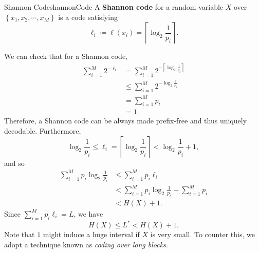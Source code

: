 \documentclass[math]{amznotes}
\theoremstyle{remark}
\begin{document}
\begin{dfnbox}{Shannon Code}{shannonCode}
    A {\color{red} \textbf{Shannon code}} for a random variable $X$ over $\left\{x_1, x_2, \cdots, x_M\right\}$ is a code satisfying 
    \begin{equation*}
        \ell_i \coloneqq \ell\left(x_i\right) = \left\lceil\log_2\frac{1}{p_i}\right\rceil.
    \end{equation*}
\end{dfnbox}
We can check that for a Shannon code,
\begin{align*}
    \sum_{i = 1}^{M}2^{-\ell_i} & = \sum_{i = 1}^{M}2^{-\left\lceil\log_2\frac{1}{p_i}\right\rceil} \\
    & \leq \sum_{i = 1}^{M}2^{-\log_2\frac{1}{p_i}} \\
    & = \sum_{i = 1}^{M}p_i\\
    & = 1.
\end{align*}
Therefore, a Shannon code can be always made prefix-free and thus uniquely decodable. Furthermore, 
\begin{equation*}
    \log_2\frac{1}{p_i} \leq \ell_i = \left\lceil\log_2\frac{1}{p_i}\right\rceil < \log_2\frac{1}{p_i} + 1,
\end{equation*}
and so 
\begin{align*}
    \sum_{i = 1}^{M}p_i\log_2\frac{1}{p_i} & \leq \sum_{i = 1}^{M}p_i\ell_i \\
    & < \sum_{i = 1}^{M}p_i\log_2\frac{1}{p_i} + \sum_{i = 1}^{M}p_i \\
    & < H\left(X\right) + 1.
\end{align*}
Since $\sum_{i = 1}^{M}p_i\ell_i = L$, we have
\begin{equation*}
    H\left(X\right) \leq L^* < H\left(X\right) + 1.
\end{equation*}
Note that $1$ might induce a huge interval if $X$ is very small. To counter this, we adopt a technique known as \textit{coding over long blocks}.
\end{document}
